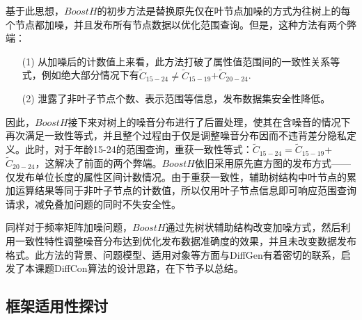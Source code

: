 基于此思想，$BoostH$的初步方法是替换原先仅在叶节点加噪的方式为往树上的每个节点都加噪，并且发布所有节点数据以优化范围查询。但是，这种方法有两个弊端：
\begin{itemize}
	\item[(1)] 从加噪后的计数值上来看，此方法打破了属性值范围间的一致性关系等式，例如绝大部分情况下有{$\widetilde{C}_{15-24}$}$ \neq ${$\widetilde{C}_{15-19}$}+{$\widetilde{C}_{20-24}$}.
	\item[(2)] 泄露了非叶子节点个数、表示范围等信息，发布数据集安全性降低。
\end{itemize}

因此，$BoostH$接下来对树上的噪音分布进行了后置处理，使其在含噪音的情况下再次满足一致性等式，并且整个过程由于仅是调整噪音分布因而不违背差分隐私定义。此时，对于年龄15-24的范围查询，重获一致性等式：{$\widetilde{C}_{15-24}$}$ = ${$\widetilde{C}_{15-19}$}+{$\widetilde{C}_{20-24}$}，这解决了前面的两个弊端。$BoostH$依旧采用原先直方图的发布方式——仅发布单位长度的属性区间计数情况。由于重获一致性，辅助树结构中叶节点的累加运算结果等同于非叶子节点的计数值，所以仅用叶子节点信息即可响应范围查询请求，减免叠加问题的同时不失安全性。

同样对于频率矩阵加噪问题，$BoostH$通过先树状辅助结构改变加噪方式，然后利用一致性特性调整噪音分布达到优化发布数据准确度的效果，并且未改变数据发布格式。此方法的背景、问题模型、适用对象等方面与DiffGen有着密切的联系，启发了本课题DiffCon算法的设计思路，在下节予以总结。


\subsection{框架适用性探讨}

